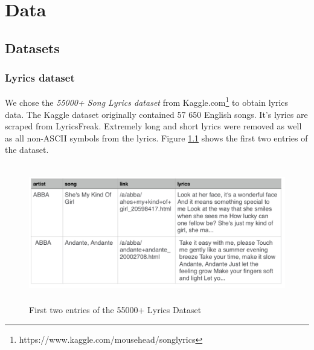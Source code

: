 \chapter{Data}

\section{Datasets}

\subsection{Lyrics dataset}
 We chose the \textit{55000+ Song Lyrics dataset} from
 Kaggle.com\footnote{https://www.kaggle.com/mousehead/songlyrics} to obtain lyrics
 data. The Kaggle dataset originally contained 57 650 English songs. It’s lyrics are
 scraped from LyricsFreak. Extremely long and short lyrics were removed as well as
 all non-ASCII symbols from the lyrics. Figure \ref{fig:lyrics_dataset} shows the
 first two entries of the dataset.\\
 \begin{figure}[h]
    \centering
	\includegraphics[height=60mm]{./img/dataset_preview.png}
	\caption{First two entries of the 55000+ Lyrics Dataset}
	\label{fig:lyrics_dataset}
\end{figure}

